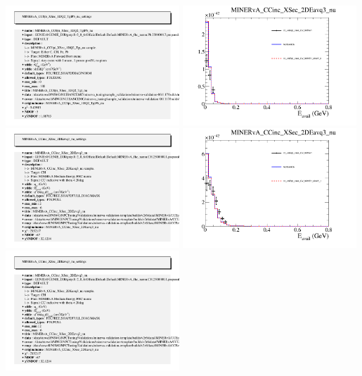 \documentclass{article}
\begin{document}
\includegraphics[width=0.49\textwidth]{figures/Lead_info.png}
\centering
\includegraphics[width=0.49\textwidth]{figures/cc_visEq3_xsec_CV_WithErr_slice_0_comp.png}
\includegraphics[width=0.49\textwidth]{figures/cc_visEq3_xsec_CV_WithErr_info.png}
\centering
\includegraphics[width=0.49\textwidth]{figures/cc_visEq3_xsec_CV_WithErr_slice_1_comp.png}
\includegraphics[width=0.49\textwidth]{figures/cc_visEq3_xsec_CV_WithErr_info.png}
\end{document}
